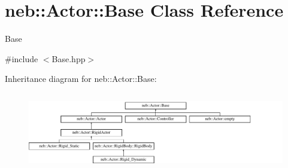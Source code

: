 \hypertarget{classneb_1_1Actor_1_1Base}{\section{neb\-:\-:\-Actor\-:\-:\-Base \-Class \-Reference}
\label{classneb_1_1Actor_1_1Base}
}


\-Base  




{\ttfamily \#include $<$\-Base.\-hpp$>$}

\-Inheritance diagram for neb\-:\-:\-Actor\-:\-:\-Base\-:\begin{figure}[H]
\begin{center}
\leavevmode
\includegraphics[height=3.431373cm]{classneb_1_1Actor_1_1Base}
\end{center}
\end{figure}
